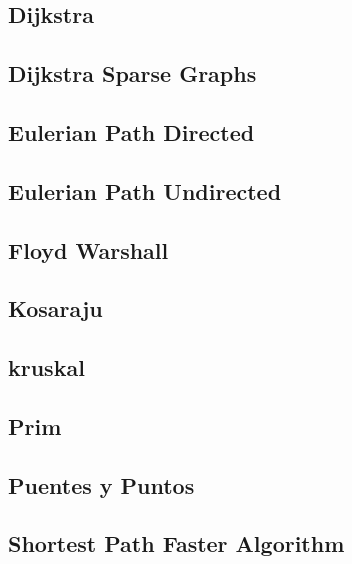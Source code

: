 \subsection{Dijkstra}
\raggedbottom
\hrulefill
\subsection{Dijkstra Sparse Graphs}
\raggedbottom
\hrulefill
\subsection{Eulerian Path Directed}
\raggedbottom
\hrulefill
\subsection{Eulerian Path Undirected}
\raggedbottom
\hrulefill
\subsection{Floyd Warshall}
\raggedbottom
\hrulefill
\subsection{Kosaraju}
\raggedbottom
\hrulefill
\subsection{kruskal}
\raggedbottom
\hrulefill
\subsection{Prim}
\raggedbottom
\hrulefill
\subsection{Puentes y Puntos}
\raggedbottom
\hrulefill
\subsection{Shortest Path Faster Algorithm}
\raggedbottom
\hrulefill
